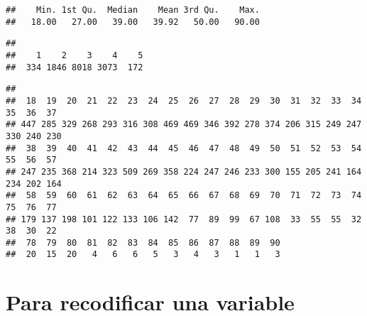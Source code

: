 \documentclass[
]{article}
\newenvironment{Shaded}{\begin{snugshade}}{\end{snugshade}}
\newcommand{\FunctionTok}[1]{\textcolor[rgb]{0.13,0.29,0.53}{\textbf{#1}}}
\newcommand{\NormalTok}[1]{#1}
\newcommand{\SpecialCharTok}[1]{\textcolor[rgb]{0.81,0.36,0.00}{\textbf{#1}}}
\begin{document}
\begin{Shaded}
\end{Shaded}

\begin{verbatim}
##    Min. 1st Qu.  Median    Mean 3rd Qu.    Max. 
##   18.00   27.00   39.00   39.92   50.00   90.00
\end{verbatim}

\begin{Shaded}
\end{Shaded}

\begin{verbatim}
## 
##    1    2    3    4    5 
##  334 1846 8018 3073  172
\end{verbatim}

\begin{Shaded}
\end{Shaded}

\begin{verbatim}
## 
##  18  19  20  21  22  23  24  25  26  27  28  29  30  31  32  33  34  35  36  37 
## 447 285 329 268 293 316 308 469 469 346 392 278 374 206 315 249 247 330 240 230 
##  38  39  40  41  42  43  44  45  46  47  48  49  50  51  52  53  54  55  56  57 
## 247 235 368 214 323 509 269 358 224 247 246 233 300 155 205 241 164 234 202 164 
##  58  59  60  61  62  63  64  65  66  67  68  69  70  71  72  73  74  75  76  77 
## 179 137 198 101 122 133 106 142  77  89  99  67 108  33  55  55  32  38  30  22 
##  78  79  80  81  82  83  84  85  86  87  88  89  90 
##  20  15  20   4   6   6   5   3   4   3   1   1   3
\end{verbatim}

\hypertarget{para-recodificar-una-variable}{%
\section{Para recodificar una
variable}\label{para-recodificar-una-variable}}
\end{document}
